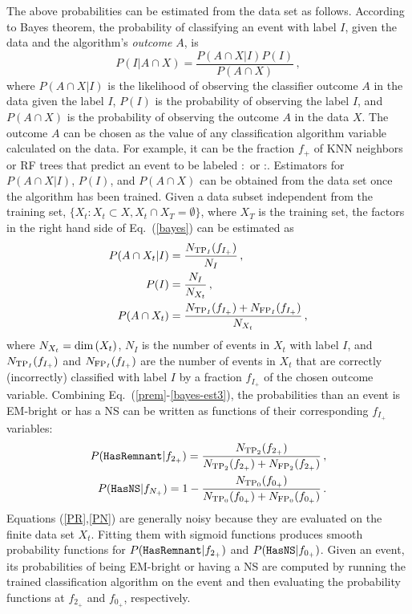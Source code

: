 The above probabilities can be estimated from the data set as follows. According to Bayes theorem, the probability of classifying an event with label $I$, given the data and the
algorithm's \emph{outcome} $A$, is
%
\begin{equation}
P(I|A \cap X)=\frac{P(A \cap X|I)P(I)}{P(A \cap X)}\,,
\label{bayes}
\end{equation}
%
where $P(A \cap X|I)$ is the likelihood of observing the classifier outcome $A$ in the data given the label $I$, $P(I)$ is the probability of observing the label $I$, and $P(A \cap X)$
is the probability of observing the outcome $A$ in the data $X$. The outcome $A$ can be chosen as the value of any classification algorithm variable calculated on the data. For
example, it can be the fraction $f_+$ of \ac{KNN} neighbors or \ac{RF} trees that predict an event to be labeled \hasns:\true\ or \hasrem:\true. Estimators for $P(A \cap X|I)$, $P(I)$, and $P(A \cap X)$ can be obtained from the data set once the algorithm has been trained. Given a data subset independent
from the training set, $\{X_t:X_t\subset X,X_t \cap X_T=\emptyset\}$, where $X_T$ is the training set, the factors in the right hand side of Eq.~(\ref{bayes}) can be estimated as 
%
\begin{align}
P(A \cap X_t|I)&=\frac{N_{{\rm TP}_I}(f_{I_+})}{N_I}\,,\label{bayes-est1}\\
P(I)&=\frac{N_I}{N_{X_t}}\,,\label{bayes-est2}\\
P(A \cap X_t)&=\frac{N_{{\rm TP}_I}(f_{I_+})+N_{{\rm FP}_I}(f_{I_+})}{N_{X_t}}\,,\label{bayes-est3}
\end{align}
%
where $N_{X_{t}}=\hbox{dim}\,(X_t)$, $N_{I}$ is the number of events in $X_t$ with label $I$, and $N_{{\rm TP}_I}(f_{I_+})$ and $N_{{\rm FP}_I}(f_{I_+})$ are the number of events in $X_t$ that are correctly (incorrectly) classified with label $I$ by a fraction $f_{I_+}$ of the chosen outcome variable. Combining Eq.~(\ref{prem}-\ref{bayes-est3}), the probabilities than an event is \ac{EM}-bright or has a \ac{NS} can be written as functions of their corresponding $f_{I_+}$ variables:
%
\begin{align}
P({{\tt HasRemnant}}|f_{2_+})=\frac{N_{{\rm TP}_2}(f_{2_+})}{N_{{\rm TP}_2}(f_{2_+})+N_{{\rm FP}_2}(f_{2_+})}\,,\label{PR}\\
P({{\tt HasNS}}|f_{N_+})=1-\frac{N_{{\rm TP}_0}(f_{0_+})}{N_{{\rm TP}_0}(f_{0_+})+N_{{\rm FP}_0}(f_{0_+})}\,.\label{PN}
\end{align}
%
Equations (\ref{PR},\ref{PN}) are generally noisy because they are evaluated on the finite data set $X_t$. Fitting them with sigmoid functions produces smooth probability functions for $P({{\tt HasRemnant}}|f_{2_+})$ and $P({{\tt HasNS}}|f_{0_+})$. Given an event, its probabilities of being \ac{EM}-bright or having a \ac{NS} are computed by running the trained classification algorithm on the event and then evaluating the probability functions at $f_{2_+}$ and $f_{0_+}$, respectively.

